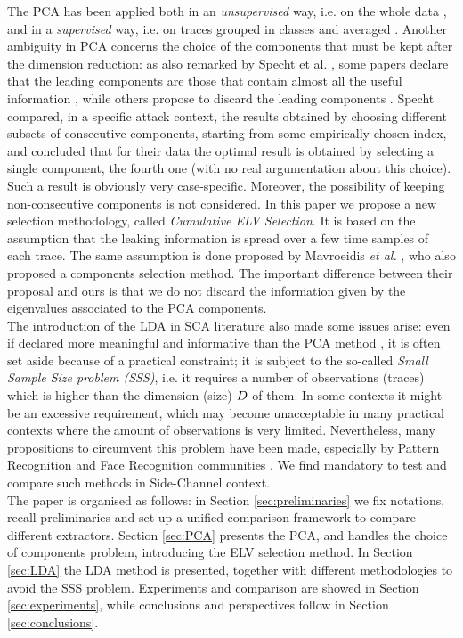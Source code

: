  The PCA has been applied both in an {\em unsupervised} way, i.e. on the whole data \cite{Batina2012,karsmakers2009side}, and in a {\em supervised} way, i.e. on traces grouped in classes and averaged \cite{TAprincipal,choudaryefficient,choudary2014efficient,disassembler,Standaert2008}. Another ambiguity in PCA concerns the choice of the components that must be kept after the dimension reduction: as also remarked by Specht et al.  \cite{specht}, some papers declare that the leading components are those that contain almost all the useful information \cite{TAprincipal}, while others propose to discard the leading components \cite{Batina2012}. Specht compared, in a specific attack context, the results obtained by choosing different subsets of consecutive components, starting from some empirically chosen index, and concluded that for their data the optimal result is obtained by selecting a single component, the fourth one (with no real argumentation about this choice). Such a result is obviously very case-specific. Moreover, the possibility of keeping non-consecutive components is not considered. In this paper we propose a new selection methodology, called {\em Cumulative ELV Selection}. It is based on the assumption that the leaking information is spread over a few time samples of each trace. The same assumption is done proposed by Mavroeidis \textit{et al.} \cite{SCAclassProbl}, who also proposed a components selection method. The important difference between their proposal and ours is that we do not discard the information given by the eigenvalues associated to the PCA components.  \\

The introduction of the LDA in SCA literature also made some issues arise: even if declared more meaningful and informative than the PCA method \cite{lessIsMore,Standaert2008}, it is often set aside because of a practical constraint; it is subject to the so-called {\em Small Sample Size problem (SSS)}, i.e. it requires a number of observations (traces) which is higher than the dimension (size) $D$ of them. In some contexts it might be an excessive requirement, which may become unacceptable in many practical contexts where the amount of observations is very limited. Nevertheless, many propositions to circumvent this problem have been made, especially by Pattern Recognition and Face Recognition communities \cite{eigenfaces,Chen2000,huang,Yu01adirect}. We find mandatory to test and compare such methods in Side-Channel context.\\

The paper is organised as follows: in Section \ref{sec:preliminaries} we fix notations, recall preliminaries and set up a unified comparison framework to compare different extractors. Section \ref{sec:PCA} presents the PCA, and handles the choice of components problem, introducing the  ELV selection method. In Section \ref{sec:LDA} the LDA method is presented, together with different methodologies to avoid the SSS problem. Experiments and comparison are showed in Section \ref{sec:experiments}, while conclusions and perspectives follow in Section \ref{sec:conclusions}. 

